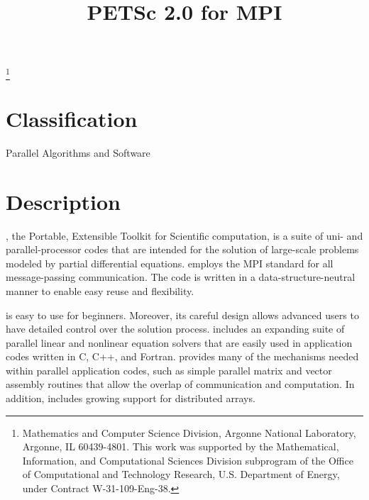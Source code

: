 \pagestyle{empty}

\pagestyle{empty}
\title{PETSc 2.0 for MPI}
\thanks{Mathematics and Computer Science Division,
Argonne National Laboratory,
Argonne, IL 60439-4801.
This work was supported by the Mathematical,
        Information, and Computational Sciences Division subprogram of
        the Office of Computational and Technology Research,
        U.S. Department of Energy, under Contract W-31-109-Eng-38.}

\date{}
\maketitle

\newcommand{\vsp}{\vspace{-1.5mm}}

\section*{Classification} Parallel Algorithms and Software

\section*{Description}

, the Portable, Extensible Toolkit for Scientific computation,
is a suite of uni- and parallel-processor codes that are intended for
the solution of large-scale problems modeled by partial differential
equations.   employs the MPI standard for all
message-passing communication.  The code is written in a
data-structure-neutral manner to enable easy reuse and flexibility.

 is easy to use for beginners.  Moreover, its careful
design allows advanced users to have detailed control over the
solution process.  includes an expanding suite of parallel
linear and nonlinear equation solvers that are easily used in
application codes written in C, C++, and Fortran.  
provides many of the mechanisms needed within parallel application
codes, such as simple parallel matrix and vector assembly routines
that allow the overlap of communication and computation.  In addition,
 includes growing support for distributed arrays.

